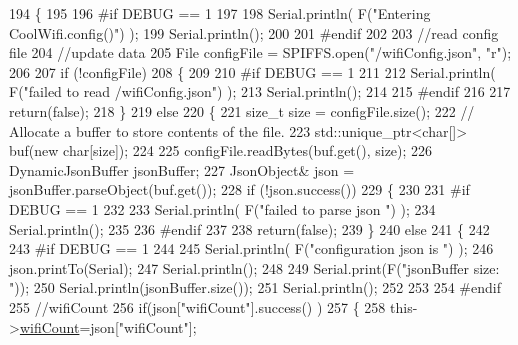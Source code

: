 \begin{DoxyCode}
194 \{
195 
196 \textcolor{preprocessor}{#if DEBUG == 1 }
197 
198     Serial.println( F(\textcolor{stringliteral}{"Entering CoolWifi.config()"}) );
199     Serial.println();
200 
201 \textcolor{preprocessor}{#endif}
202 
203     \textcolor{comment}{//read config file}
204     \textcolor{comment}{//update data}
205     File configFile = SPIFFS.open(\textcolor{stringliteral}{"/wifiConfig.json"}, \textcolor{stringliteral}{"r"});
206 
207     \textcolor{keywordflow}{if} (!configFile) 
208     \{
209     
210 \textcolor{preprocessor}{    #if DEBUG == 1 }
211 
212         Serial.println( F(\textcolor{stringliteral}{"failed to read /wifiConfig.json"}) );
213         Serial.println();
214 
215 \textcolor{preprocessor}{    #endif}
216 
217         \textcolor{keywordflow}{return}(\textcolor{keyword}{false});
218     \}
219     \textcolor{keywordflow}{else}
220     \{
221         \textcolor{keywordtype}{size\_t} size = configFile.size();
222         \textcolor{comment}{// Allocate a buffer to store contents of the file.}
223         std::unique\_ptr<char[]> buf(\textcolor{keyword}{new} \textcolor{keywordtype}{char}[size]);
224 
225         configFile.readBytes(buf.get(), size);
226         DynamicJsonBuffer jsonBuffer;
227         JsonObject& json = jsonBuffer.parseObject(buf.get());
228         \textcolor{keywordflow}{if} (!json.success()) 
229         \{
230         
231 \textcolor{preprocessor}{        #if DEBUG == 1 }
232 
233             Serial.println( F(\textcolor{stringliteral}{"failed to parse json "}) );
234             Serial.println();
235         
236 \textcolor{preprocessor}{        #endif}
237             
238             \textcolor{keywordflow}{return}(\textcolor{keyword}{false});
239         \} 
240         \textcolor{keywordflow}{else}
241         \{
242         
243 \textcolor{preprocessor}{        #if DEBUG == 1 }
244         
245             Serial.println( F(\textcolor{stringliteral}{"configuration json is "}) );
246             json.printTo(Serial);
247             Serial.println();
248 
249             Serial.print(F(\textcolor{stringliteral}{"jsonBuffer size: "}));
250             Serial.println(jsonBuffer.size());
251             Serial.println();
252 
253 
254 \textcolor{preprocessor}{        #endif}
255             \textcolor{comment}{//wifiCount}
256             \textcolor{keywordflow}{if}(json[\textcolor{stringliteral}{"wifiCount"}].success() )
257             \{           
258                 this->\hyperlink{classCoolWifi_ab133bd92fcb895b884deecd6678592e4}{wifiCount}=json[\textcolor{stringliteral}{"wifiCount"}];

\end{DoxyCode}
